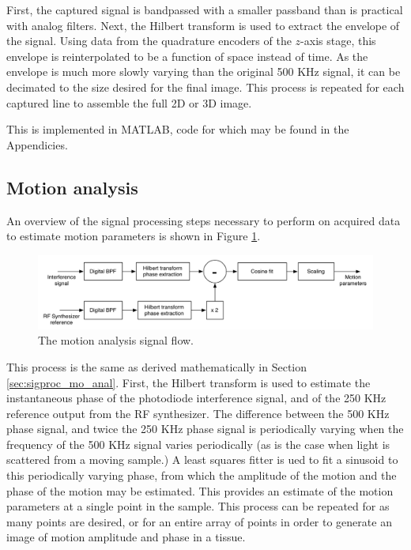 First, the captured signal is bandpassed with a smaller passband than is practical with analog filters. Next, the Hilbert transform is used to extract the envelope of the signal. Using data from the quadrature encoders of the $z$-axis stage, this envelope is reinterpolated to be a function of space instead of time. As the envelope is much more slowly varying than the original 500 KHz signal, it can be decimated to the size desired for the final image. This process is repeated for each captured line to assemble the full 2D or 3D image.

This is implemented in MATLAB, code for which may be found in the Appendicies.

\subsection{Motion analysis}

An overview of the signal processing steps necessary to perform on acquired data to estimate motion parameters is shown in Figure \ref{fig:motion_analysis_block_diagram}.

\begin{figure}[h!]
\centering
\includegraphics[width=1.0\textwidth]{Images/Background/motion_process.png}
\caption{The motion analysis signal flow. \label{fig:motion_analysis_block_diagram}}
\end{figure}

This process is the same as derived mathematically in Section \ref{sec:sigproc_mo_anal}. First, the Hilbert transform is used to estimate the instantaneous phase of the photodiode interference signal, and of the 250 KHz reference output from the RF synthesizer. The difference between the 500 KHz phase signal, and twice the 250 KHz phase signal is periodically varying when the frequency of the 500 KHz signal varies periodically (as is the case when light is scattered from a moving sample.) A least squares fitter is ued to fit a sinusoid to this periodically varying phase, from which the amplitude of the motion and the phase of the motion may be estimated. This provides an estimate of the motion parameters at a single point in the sample. This process can be repeated for as many points are desired, or for an entire array of points in order to generate an image of motion amplitude and phase in a tissue.

